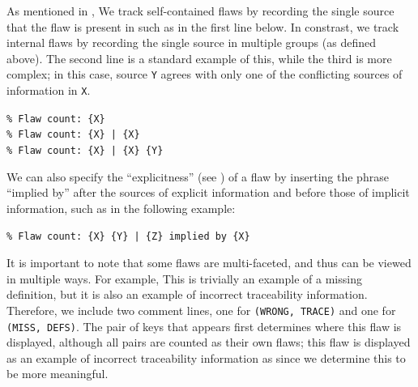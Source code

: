     As mentioned in , \oneSrcDistinct{} We track
    self-contained flaws by recording the single source that the flaw is present
    in such as in the first line below. In constrast, we track internal flaws
    by recording the single source in multiple groups (as defined above). The
    second line is a standard example of this, while the third is more complex;
    in this case, source \texttt{Y} agrees with only one of the conflicting
    sources of information in \texttt{X}.
    \begin{displayquote}
        \texttt{\% Flaw count: \{X\}\\\% Flaw count: \{X\} | \{X\}\\
            \% Flaw count: \{X\} | \{X\} \{Y\}}
    \end{displayquote}
    We can also specify the ``explicitness'' (see ) of a
    flaw by inserting the phrase ``implied by'' after the sources of explicit
    information and before those of implicit information, such as in the
    following example:
    \begin{displayquote}
        \texttt{\% Flaw count: \{X\} \{Y\} | \{Z\} implied by \{X\}}
    \end{displayquote}

    \label{multi-view-flaws}
    It is important to note that some flaws are multi-faceted, and thus can be
    viewed in multiple ways. For example,\seeRefMissing*{} This is trivially an
    example of a missing definition, but it is also an example of incorrect
    traceability information. Therefore, we include two comment lines, one for
    \texttt{(WRONG, TRACE)} and one for \texttt{(MISS, DEFS)}.
    The pair of keys that appears first determines where this flaw is displayed,
    although all pairs are counted as their own flaws; this flaw is displayed
    as an example of incorrect traceability information as
     since we determine this to be more meaningful.

